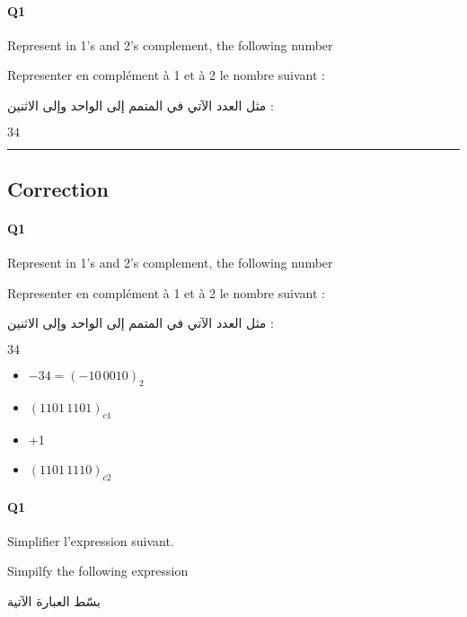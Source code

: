 \paragraph{Q1}

Represent in 1's and 2's complement, the following number


Representer en complément à 1 et à 2 le nombre suivant :


\begin{arab}[utf]
مثل  العدد الآتي في المتمم إلى الواحد وإلى الاثنين  :
\end{arab}

$34$




\hrule width 1\linewidth
\pagebreak

\subsection{Correction}


\paragraph{Q1}

Represent in 1's and 2's complement, the following number


Representer en complément à 1 et à 2 le nombre suivant :


\begin{arab}[utf]
مثل  العدد الآتي في المتمم إلى الواحد وإلى الاثنين  :
\end{arab}

$34$


\begin{itemize}
\item $-34 = ( -10\,0010 )_{2}$
\item $( 1101\,1101 )_{c1}$
\item +1
\item $( 1101\,1110 )_{c2}$
\end{itemize}

\pagebreak

\paragraph{Q1}



Simplifier l'expression suivant.



Simpilfy the following expression
\begin{arab}[utf]
بسّط العبارة الآتية
\end{arab}

